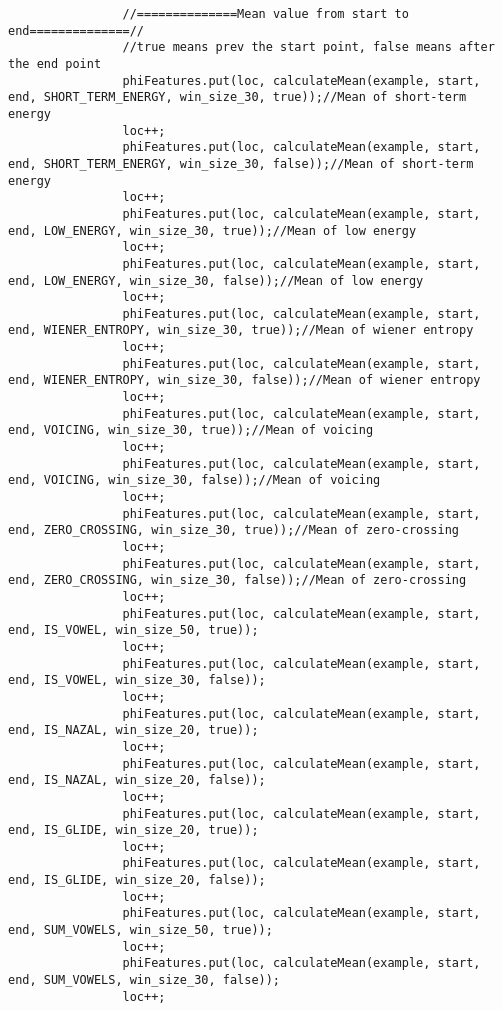 \documentclass[11pt, oneside]{article}   	%
\begin{document}
\begin{lstlisting}
                //==============Mean value from start to end==============//
                //true means prev the start point, false means after the end point
                phiFeatures.put(loc, calculateMean(example, start, end, SHORT_TERM_ENERGY, win_size_30, true));//Mean of short-term energy
                loc++;
                phiFeatures.put(loc, calculateMean(example, start, end, SHORT_TERM_ENERGY, win_size_30, false));//Mean of short-term energy
                loc++;
                phiFeatures.put(loc, calculateMean(example, start, end, LOW_ENERGY, win_size_30, true));//Mean of low energy
                loc++;
                phiFeatures.put(loc, calculateMean(example, start, end, LOW_ENERGY, win_size_30, false));//Mean of low energy
                loc++;
                phiFeatures.put(loc, calculateMean(example, start, end, WIENER_ENTROPY, win_size_30, true));//Mean of wiener entropy
                loc++;
                phiFeatures.put(loc, calculateMean(example, start, end, WIENER_ENTROPY, win_size_30, false));//Mean of wiener entropy
                loc++;
                phiFeatures.put(loc, calculateMean(example, start, end, VOICING, win_size_30, true));//Mean of voicing
                loc++;
                phiFeatures.put(loc, calculateMean(example, start, end, VOICING, win_size_30, false));//Mean of voicing
                loc++;
                phiFeatures.put(loc, calculateMean(example, start, end, ZERO_CROSSING, win_size_30, true));//Mean of zero-crossing
                loc++;
                phiFeatures.put(loc, calculateMean(example, start, end, ZERO_CROSSING, win_size_30, false));//Mean of zero-crossing
                loc++;
                phiFeatures.put(loc, calculateMean(example, start, end, IS_VOWEL, win_size_50, true));
                loc++;
                phiFeatures.put(loc, calculateMean(example, start, end, IS_VOWEL, win_size_30, false));
                loc++;
                phiFeatures.put(loc, calculateMean(example, start, end, IS_NAZAL, win_size_20, true));
                loc++;
                phiFeatures.put(loc, calculateMean(example, start, end, IS_NAZAL, win_size_20, false));
                loc++;
                phiFeatures.put(loc, calculateMean(example, start, end, IS_GLIDE, win_size_20, true));
                loc++;
                phiFeatures.put(loc, calculateMean(example, start, end, IS_GLIDE, win_size_20, false));
                loc++;
                phiFeatures.put(loc, calculateMean(example, start, end, SUM_VOWELS, win_size_50, true));
                loc++;
                phiFeatures.put(loc, calculateMean(example, start, end, SUM_VOWELS, win_size_30, false));
                loc++;


\end{lstlisting}
\end{document}
